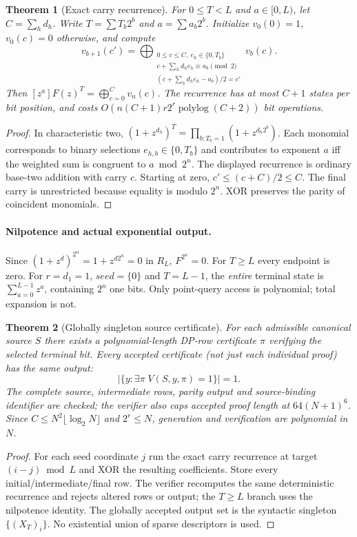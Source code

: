 \documentclass[10pt]{article}
\newtheorem{theorem}{Theorem}
\begin{document}
\begin{theorem}[Exact carry recurrence]
For $0\le T<L$ and $a\in[0,L)$, let $C=\sum_hd_h$.
Write $T=\sum T_b2^b$ and $a=\sum a_b2^b$.
Initialize $v_0(0)=1$, $v_0(c)=0$ otherwise, and compute
\[
v_{b+1}(c')=
\bigoplus_{\substack{0\le c\le C,\ e_h\in\{0,T_b\}\\
c+\sum_hd_he_h\equiv a_b\pmod2\\
(c+\sum_hd_he_h-a_b)/2=c'}}v_b(c).
\]
Then $[z^a]F(z)^T=\bigoplus_{c=0}^C v_n(c)$.
The recurrence has at most $C+1$ states per bit position,
and costs $O(n(C+1)r2^r\operatorname{polylog}(C+2))$ bit operations.
\end{theorem}
\begin{proof}
In characteristic two,
$(1+z^{d_h})^T=\prod_{b:T_b=1}(1+z^{d_h2^b})$.
Each monomial corresponds to binary selections
$e_{h,b}\in\{0,T_b\}$ and contributes to exponent $a$
iff the weighted sum is congruent to $a\bmod 2^n$.
The displayed recurrence is ordinary base-two addition with
carry $c$. Starting at zero, $c'\le(c+C)/2\le C$.
The final carry is unrestricted because equality is modulo $2^n$.
XOR preserves the parity of coincident monomials.
\end{proof}
\paragraph{Nilpotence and actual exponential output.}
Since $(1+z^d)^{2^n}=1+z^{d2^n}=0$ in $R_L$,
$F^{2^n}=0$. For $T\ge L$ every endpoint is zero.
For $r=d_1=1$, $seed=\{0\}$ and $T=L-1$, the
\emph{entire} terminal state is
$\sum_{a=0}^{L-1}z^a$, containing $2^n$ one bits.
Only point-query access is polynomial; total expansion is not.
\begin{theorem}[Globally singleton source certificate]
For each admissible canonical source $S$ there exists a
polynomial-length DP-row certificate $\pi$ verifying the selected
terminal bit. Every accepted certificate (not just each individual
proof) has the same output:
\[
\left|\{y:\exists\pi\;V(S,y,\pi)=1\}\right|=1.
\]
The complete source, intermediate rows, parity output and
source-binding identifier are checked; the verifier also caps
accepted proof length at $64(N+1)^6$. Since
$C\le N^2\lfloor\log_2N\rfloor$ and $2^r\le N$,
generation and verification are polynomial in $N$.
\end{theorem}
\begin{proof}
For each seed coordinate $j$ run the exact carry recurrence
at target $(i-j)\bmod L$ and XOR the resulting coefficients.
Store every initial/intermediate/final row. The verifier recomputes
the same deterministic recurrence and rejects altered rows or output;
the $T\ge L$ branch uses the nilpotence identity.
The globally accepted output set is the syntactic singleton
$\{(X_T)_i\}$. No existential union of sparse descriptors is used.
\end{proof}
\end{document}

